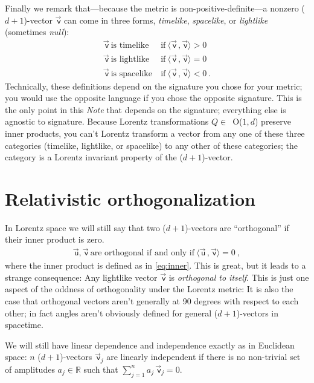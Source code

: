 \documentclass{article}
\newcommand\upvec[1]{\!\vec{\,\mathrm{#1}}}
\newcommand{\Lvec}[1]{\upvec{\mathsf{#1}}} %
\newcommand{\inner}[2]{\langle{#1}\,,{#2}\rangle}
\newcommand{\plus}{\!+\!} %
\newcommand{\documentname}{\textsl{Note}}
\begin{document}
Finally we remark that---because the metric is non-positive-definite---a nonzero ($d\plus1$)-vector $\Lvec{v}$ can come in three forms, \emph{timelike}, \emph{spacelike}, or \emph{lightlike} (sometimes \emph{null}):
\begin{align}
    \Lvec{v} ~ \mbox{is timelike}  &~ \mbox{if} ~ \inner{\Lvec{v}}{\Lvec{v}} > 0 \label{eq:timelike}\\
    \Lvec{v} ~ \mbox{is lightlike} &~ \mbox{if} ~ \inner{\Lvec{v}}{\Lvec{v}} = 0 \label{eq:lightlike}\\
    \Lvec{v} ~ \mbox{is spacelike} &~ \mbox{if} ~ \inner{\Lvec{v}}{\Lvec{v}} < 0 ~.\label{eq:spacelike}
\end{align}
Technically, these definitions depend on the signature you chose for your metric; you would use the opposite language if you chose the opposite signature.
This is the only point in this \documentname{} that depends on the signature; everything else is agnostic to signature.
Because Lorentz transformations $Q\in$~O($1,d$) preserve inner products, you can't Lorentz transform a vector from any one of these three categories (timelike, lightlike, or spacelike) to any other of these categories; the category is a Lorentz invariant property of the ($d\plus1$)-vector.

\section{Relativistic orthogonalization}\label{sec:orth}

In Lorentz space we will still say that two ($d\plus1$)-vectors are ``orthogonal'' if their inner product is zero.
\begin{align}
    \Lvec{u},\Lvec{v} ~ \mbox{are orthogonal if and only if} ~ \inner{\Lvec{u}}{\Lvec{v}}=0 ~,
\end{align}
where the inner product is defined as in \eqref{eq:inner}.
This is great, but it leads to a strange consequence:
Any lightlike vector $\Lvec{v}$ is \emph{orthogonal to itself}.
This is just one aspect of the oddness of orthogonality under the Lorentz metric:
It is also the case that orthogonal vectors aren't generally at 90 degrees with respect to each other; in fact angles aren't obviously defined for general ($d\plus1$)-vectors in spacetime.

We will still have linear dependence and independence exactly as in Euclidean space:
$n$ ($d\plus1$)-vectors $\Lvec{v}_j$ are linearly independent if there is no non-trivial set of amplitudes $a_j\in\mathbb{R}$ such that $\sum_{j=1}^n a_j\,\Lvec{v}_j = 0$.
\end{document}

